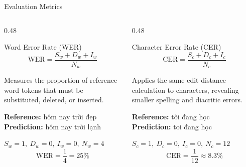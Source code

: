 \begin{frame}{Evaluation Metrics}
  \small
  \begin{columns}[T,onlytextwidth]
    \begin{column}{0.48\textwidth}
      \begin{block}{Word Error Rate (WER)}
        \centering
        \[
          \mathrm{WER}=\frac{S_w+D_w+I_w}{N_w}
        \]
        \raggedright
        \scriptsize
        Measures the proportion of reference word tokens that must be substituted, deleted, or inserted.

        \vspace{0.08cm}
        \textbf{Reference:} hôm nay trời \textcolor{ClassicBlue}{đẹp}\\
        \textbf{Prediction:} hôm nay trời \textcolor{red!75!black}{lạnh}

        \vspace{0.05cm}
        $S_w=1,\ D_w=0,\ I_w=0,\ N_w=4$
        \[
          \mathrm{WER}=\frac{1}{4}=25\%
        \]
      \end{block}
    \end{column}
    \begin{column}{0.48\textwidth}
      \begin{block}{Character Error Rate (CER)}
        \centering
        \[
          \mathrm{CER}=\frac{S_c+D_c+I_c}{N_c}
        \]
        \raggedright
        \scriptsize
        Applies the same edit-distance calculation to characters, revealing smaller spelling and diacritic errors.

        \vspace{0.08cm}
        \textbf{Reference:} t\textcolor{ClassicBlue}{ô}i đang học\\
        \textbf{Prediction:} t\textcolor{red!75!black}{o}i đang học

        \vspace{0.05cm}
        $S_c=1,\ D_c=0,\ I_c=0,\ N_c=12$
        \[
          \mathrm{CER}=\frac{1}{12}\approx 8.3\%
        \]
      \end{block}
    \end{column}
  \end{columns}
\end{frame}


